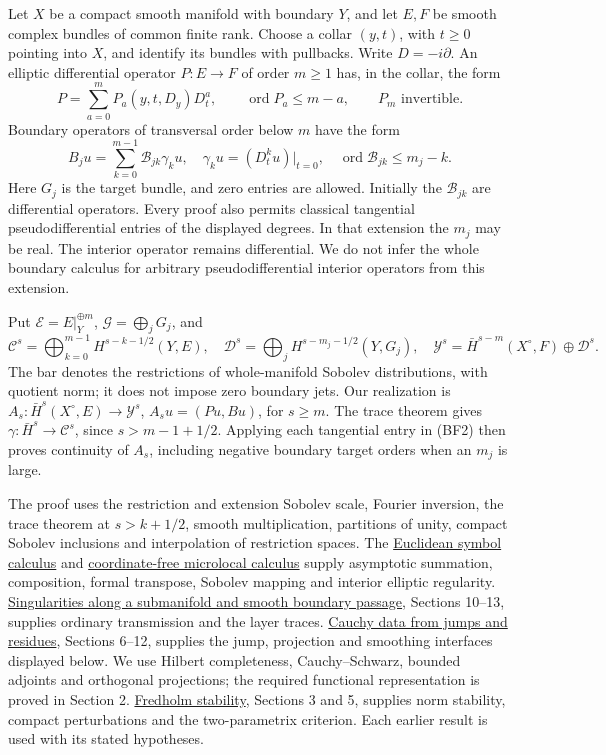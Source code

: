 \documentclass[
  11pt,
]{article}
\begin{document}
Let \(X\) be a compact smooth manifold with boundary \(Y\), and let
\(E,F\) be smooth complex bundles of common finite rank. Choose a collar
\((y,t)\), with \(t\geq0\) pointing into \(X\), and identify its bundles
with pullbacks. Write \(D=-i\partial\). An elliptic differential
operator \(P:E\to F\) of order \(m\geq1\) has, in the collar, the form
\[
 P=\sum_{a=0}^m P_a(y,t,D_y)D_t^a,\qquad
 \operatorname{ord}P_a\leq m-a,\qquad P_m\text{ invertible}.
 \tag{BF1}
\] Boundary operators of transversal order below \(m\) have the form \[
 B_j u=\sum_{k=0}^{m-1}\mathcal B_{jk}\gamma_k u,
 \quad\gamma_k u=(D_t^ku)|_{t=0},\quad
 \operatorname{ord}\mathcal B_{jk}\leq m_j-k.
 \tag{BF2}
\] Here \(G_j\) is the target bundle, and zero entries are allowed.
Initially the \(\mathcal B_{jk}\) are differential operators. Every
proof also permits classical tangential pseudodifferential entries of
the displayed degrees. In that extension the \(m_j\) may be real. The
interior operator remains differential. We do not infer the whole
boundary calculus for arbitrary pseudodifferential interior operators
from this extension.

Put \(\mathcal E=E|_Y^{\oplus m}\), \(\mathcal G=\bigoplus_jG_j\), and
\[
 \mathcal C^s=\bigoplus_{k=0}^{m-1}H^{s-k-1/2}(Y,E),\quad
 \mathcal D^s=\bigoplus_jH^{s-m_j-1/2}(Y,G_j),\quad
 \mathcal Y^s=\bar H^{s-m}(X^\circ,F)\oplus\mathcal D^s.
 \tag{BF3}
\] The bar denotes the restrictions of whole-manifold Sobolev
distributions, with quotient norm; it does not impose zero boundary
jets. Our realization is \(A_s:\bar H^s(X^\circ,E)\to\mathcal Y^s\),
\(A_su=(Pu,Bu)\), for \(s\geq m\). The trace theorem gives
\(\gamma:\bar H^s\to\mathcal C^s\), since \(s>m-1+1/2\). Applying each
tangential entry in (BF2) then proves continuity of \(A_s\), including
negative boundary target orders when an \(m_j\) is large.

The proof uses the restriction and extension Sobolev scale, Fourier
inversion, the trace theorem at \(s>k+1/2\), smooth multiplication,
partitions of unity, compact Sobolev inclusions and interpolation of
restriction spaces. The \href{euclidean-symbol-calculus.pdf}{Euclidean
symbol calculus} and
\href{geometric-microlocal-calculus.pdf}{coordinate-free microlocal
calculus} supply asymptotic summation, composition, formal transpose,
Sobolev mapping and interior elliptic regularity.
\href{conormal-transmission.pdf}{Singularities along a submanifold and
smooth boundary passage}, Sections 10--13, supplies ordinary
transmission and the layer traces. \href{calderon-cauchy-data.pdf}{Cauchy
data from jumps and residues}, Sections 6--12, supplies the jump,
projection and smoothing interfaces displayed below. We use Hilbert
completeness, Cauchy--Schwarz, bounded adjoints and orthogonal
projections; the required functional representation is proved in Section
2. \href{fredholm-stability.pdf}{Fredholm stability}, Sections 3 and 5,
supplies norm stability, compact perturbations and the two-parametrix
criterion. Each earlier result is used with its stated hypotheses.
\end{document}
